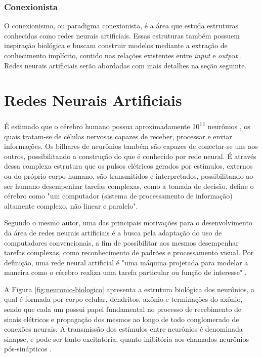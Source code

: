 \subsubsection{Conexionista}

O conexionismo, ou paradigma conexionista, é a área que estuda estruturas conhecidas como redes neurais artificiais. Essas estruturas também possuem inspiração biológica e buscam construir modelos mediante a extração de conhecimento implícito, contido nas relações existentes entre \textit{input} e \textit{output} \cite{rajagopalan1993}. Redes neurais artificiais serão abordadas com mais detalhes na seção seguinte.

\section{Redes Neurais Artificiais}

É estimado que o cérebro humano possua aproximadamente 10\textsuperscript{11} neurônios \cite{mitchell1997}, os quais tratam-se de células nervosas capazes de receber, processar e enviar informações. Os bilhares de neurônios também são capazes de conectar-se uns aos outros, possibilitando a construção do que é conhecido por rede neural. É através dessa complexa estrutura que os pulsos elétricos gerados por estímulos, externos ou do próprio corpo humano, são transmitidos e interpretados, possibilitando ao ser humano desempenhar tarefas complexas, como a tomada de decisão.  define o cérebro como "um computador (sistema de processamento de informação) altamente complexo, não linear e paralelo".

Segundo o mesmo autor, uma das principais motivações para o desenvolvimento da área de redes neurais artificiais é a busca pela adaptação do uso de computadores convencionais, a fim de possibilitar aos mesmos desempenhar tarefas complexas, como reconhecimento de padrões e processamento visual. Por definição, uma rede neural artificial é "uma máquina projetada para modelar a maneira como o cérebro realiza uma tarefa particular ou função de interesse" \cite{haykin2001}.

A Figura \ref{fig:neuronio-biologico} apresenta a estrutura biológica dos neurônios, a qual é formada por corpo celular, dendritos, axônio e terminações do axônio, sendo que cada um possui papel fundamental no processo de recebimento de sinais elétricos e propagação dos mesmos ao longo de todo conglomerado de conexões neurais. A transmissão dos estímulos entre neurônios é denominada sinapse, e pode ser tanto excitatória, quanto inibitória aos chamados neurônios pós-sinápticos \cite{lent2004}.

